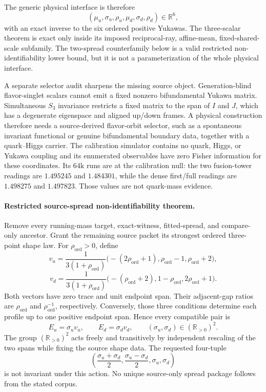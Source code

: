 \documentclass[11pt]{article}
\begin{document}
The generic physical interface is therefore
\[
(\mu_u,\sigma_u,\rho_u,\mu_d,\sigma_d,\rho_d)\in\mathbb R^6,
\]
with an exact inverse to the six ordered positive Yukawas. The three-scalar theorem is exact only
inside its imposed reciprocal-ray, affine-mean, fixed-shared-scale subfamily. The two-spread
counterfamily below is a valid restricted non-identifiability lower bound, but it
is not a parameterization of the whole physical interface.

A separate selector audit sharpens the missing source object. Generation-blind flavor-singlet
scalars cannot emit a fixed nonzero bifundamental Yukawa matrix. Simultaneous \(S_3\) invariance
restricts a fixed matrix to the span of \(I\) and \(J\), which has a degenerate eigenspace and
aligned up/down frames. A physical construction therefore needs a source-derived flavor-orbit
selector, such as a spontaneous invariant functional or genuine bifundamental boundary data,
together with a quark--Higgs carrier. The calibration simulator contains no quark, Higgs, or
Yukawa coupling and its enumerated observables have zero Fisher information for these coordinates.
Its \(64\mathrm{k}\) runs are at the calibration null: the two fusion-tower readings
are \(1.495245\) and \(1.484301\), while the dense first/full readings are \(1.498275\) and
\(1.497823\). Those values are not quark-mass evidence.

\paragraph{Restricted source-spread non-identifiability theorem.}
Remove every running-mass target, exact-witness, fitted-spread, and compare-only ancestor. Grant
the remaining source packet its strongest ordered three-point shape law. For
\(\rho_{\mathrm{ord}}>0\), define
\[
v_u=\frac{1}{3(1+\rho_{\mathrm{ord}})}
\bigl(-(2\rho_{\mathrm{ord}}+1),\rho_{\mathrm{ord}}-1,
\rho_{\mathrm{ord}}+2\bigr),
\]
\[
v_d=\frac{1}{3(1+\rho_{\mathrm{ord}})}
\bigl(-(\rho_{\mathrm{ord}}+2),1-\rho_{\mathrm{ord}},
2\rho_{\mathrm{ord}}+1\bigr).
\]
Both vectors have zero trace and unit endpoint span. Their adjacent-gap ratios are
\(\rho_{\mathrm{ord}}\) and \(\rho_{\mathrm{ord}}^{-1}\), respectively. Conversely, those
three conditions determine each profile up to one positive endpoint span. Hence every compatible
pair is
\[
E_u=\sigma_u v_u,\qquad E_d=\sigma_d v_d,
\qquad (\sigma_u,\sigma_d)\in(\mathbb R_{>0})^2.
\]
The group \((\mathbb R_{>0})^2\) acts freely and transitively by independent rescaling of the two
spans while fixing the source shape data. The requested four-tuple
\[
\left(\frac{\sigma_u+\sigma_d}{2},
\frac{\sigma_u-\sigma_d}{2},\sigma_u,\sigma_d\right)
\]
is not invariant under this action. No unique source-only spread package follows from the stated
corpus.
\end{document}
